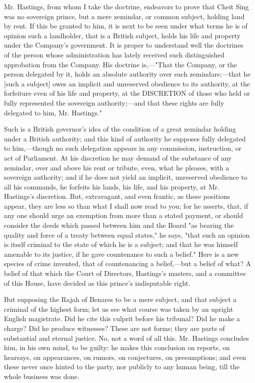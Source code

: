 Mr. Hastings, from whom I take the doctrine, endeavors to prove that Cheit Sing was no sovereign prince, but a mere zemindar, or common subject, holding land by rent. If this be granted to him, it is next to be seen under what terms he is of opinion such a landholder, that is a British subject, holds his life and property under the Company's government. It is proper to understand well the doctrines of the person whose administration has lately received such distinguished approbation from the Company. His doctrine is,—"That the Company, or the person delegated by it, holds an absolute authority over such zemindars;—that he [such a subject] owes an implicit and unreserved obedience to its authority, at the forfeiture even of his life and property, at the DISCRETION of those who held or fully represented the sovereign authority;—and that these rights are fully delegated to him, Mr. Hastings."

Such is a British governor's idea of the condition of a great zemindar holding under a British authority; and this kind of authority he supposes fully delegated to him,—though no such delegation appears in any commission, instruction, or act of Parliament. At his discretion he may demand of the substance of any zemindar, over and above his rent or tribute, even, what he pleases, with a sovereign authority; and if he does not yield an implicit, unreserved obedience to all his commands, he forfeits his lands, his life, and his property, at Mr. Hastings's discretion. But, extravagant, and even frantic, as these positions appear, they are less so than what I shall now read to you; for he asserts, that, if any one should urge an exemption from more than a stated payment, or should consider the deeds which passed between him and the Board "as bearing the quality and force of a treaty between equal states," he says, "that such an opinion is itself criminal to the state of which he is a subject; and that he was himself amenable to its justice, if he gave countenance to such a belief." Here is a new species of crime invented, that of countenancing a belief,—but a belief of what? A belief of that which the Court of Directors, Hastings's masters, and a committee of this House, have decided as this prince's indisputable right.

But supposing the Rajah of Benares to be a mere subject, and that subject a criminal of the highest form; let us see what course was taken by an upright English magistrate. Did he cite this culprit before his tribunal? Did he make a charge? Did he produce witnesses? These are not forms; they are parts of substantial and eternal justice. No, not a word of all this. Mr. Hastings concludes him, in his own mind, to be guilty: he makes this conclusion on reports, on hearsays, on appearances, on rumors, on conjectures, on presumptions; and even these never once hinted to the party, nor publicly to any human being, till the whole business was done.

